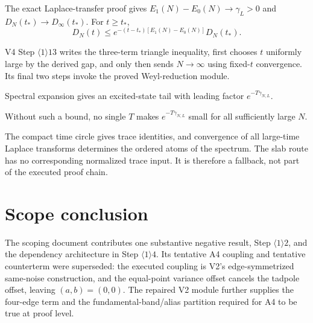 \documentclass[11pt,a4paper]{article}
\begin{document}
\Because The exact Laplace-transfer proof gives
$E_1(N)-E_0(N)\to\gamma_L>0$ and
$D_N(t_*)\to D_\infty(t_*)$.  For $t\ge t_*$,
\[
 D_N(t)\le e^{-(t-t_*)[E_1(N)-E_0(N)]}D_N(t_*).
\]


\Because V4 Step $\langle1\rangle13$ writes the three-term triangle inequality,
first chooses $t$ uniformly large by the derived gap, and only then sends
$N\to\infty$ using fixed-$t$ convergence.  Its final two steps invoke the proved
Weyl-reduction module.

\QedStep



\Because Spectral expansion gives an excited-state tail with leading factor
$e^{-T\gamma_{N,L}}$.


\Because Without such a bound, no single $T$ makes
$e^{-T\gamma_{N,L}}$ small for all sufficiently large $N$.


\Because The compact time circle gives trace identities, and convergence of all
large-time Laplace transforms determines the ordered atoms of the spectrum.  The
slab route has no corresponding normalized trace input.  It is therefore a fallback,
not part of the executed proof chain.

\QedStep

\section{Scope conclusion}

The scoping document contributes one substantive negative result, Step
$\langle1\rangle2$, and the dependency architecture in Step
$\langle1\rangle4$.  Its tentative A4 coupling and tentative counterterm were
superseded: the executed coupling is V2's edge-symmetrized same-noise construction,
and the equal-point variance offset cancels the tadpole offset, leaving
$(a,b)=(0,0)$.  The repaired V2 module further supplies the four-edge term and the
fundamental-band/alias partition required for A4 to be true at proof level.
\end{document}
